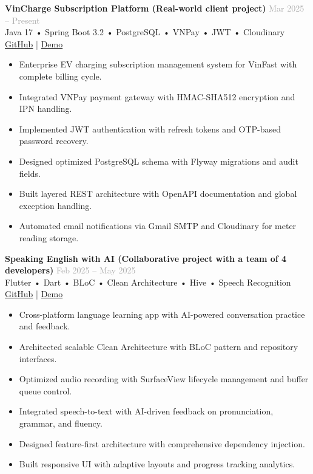 \documentclass[10pt,a4paper]{article}
\newcommand{\projectitem}[5]{
    \noindent\begin{tcolorbox}[
        colback=white,
        colframe=lightgray,
        boxrule=0.3pt,
        arc=2pt,
        top=3pt,
        bottom=3pt,
        left=6pt,
        right=6pt
    ]
        \noindent\textbf{\color{primary}#1} \hfill \textcolor{darkgray}{\scriptsize#2}\\[1pt]
        {\small\color{secondary}#3}\\[1pt]
        {\scriptsize\color{darkgray}#4}\\[3pt]
        #5
    \end{tcolorbox}
}
\begin{document}
\projectitem{VinCharge Subscription Platform (Real-world client project) }{Mar 2025 -- Present}
    {Java 17 • Spring Boot 3.2 • PostgreSQL • VNPay • JWT • Cloudinary}
    {\href{https://github.com/dungken}{\textcolor{secondary}{\faGithub* GitHub}} | \href{YOUR_YOUTUBE_DEMO_LINK}{\textcolor{secondary}{\faYoutube* Demo}}}
    {\begin{itemize}[leftmargin=12pt,itemsep=1pt,parsep=0pt,topsep=0pt,after=\vspace{-2pt},label={•}]
        \item Enterprise EV charging subscription management system for VinFast with complete billing cycle.
        \item Integrated VNPay payment gateway with HMAC-SHA512 encryption and IPN handling.
        \item Implemented JWT authentication with refresh tokens and OTP-based password recovery.
        \item Designed optimized PostgreSQL schema with Flyway migrations and audit fields.
        \item Built layered REST architecture with OpenAPI documentation and global exception handling.
        \item Automated email notifications via Gmail SMTP and Cloudinary for meter reading storage.
    \end{itemize}}

\vspace{3pt}

\projectitem{Speaking English with AI (Collaborative project with a team of 4 developers) }{Feb 2025 -- May 2025}
    {Flutter • Dart • BLoC • Clean Architecture • Hive • Speech Recognition}
    {\href{https://github.com/dungken}{\textcolor{secondary}{\faGithub* GitHub}} | \href{YOUR_YOUTUBE_DEMO_LINK}{\textcolor{secondary}{\faYoutube* Demo}}}
    {\begin{itemize}[leftmargin=12pt,itemsep=1pt,parsep=0pt,topsep=0pt,after=\vspace{-2pt},label={•}]
        \item Cross-platform language learning app with AI-powered conversation practice and feedback.
        \item Architected scalable Clean Architecture with BLoC pattern and repository interfaces.
        \item Optimized audio recording with SurfaceView lifecycle management and buffer queue control.
        \item Integrated speech-to-text with AI-driven feedback on pronunciation, grammar, and fluency.
        \item Designed feature-first architecture with comprehensive dependency injection.
        \item Built responsive UI with adaptive layouts and progress tracking analytics.
    \end{itemize}}
\end{document}
